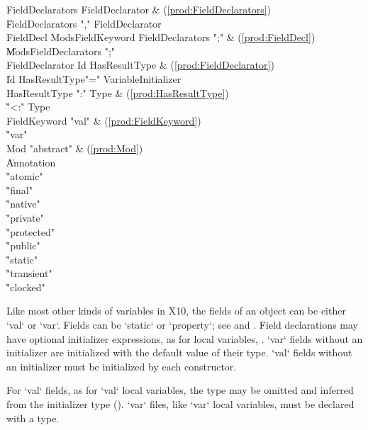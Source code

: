 \begin{bbgrammar}
 FieldDeclarators    \: FieldDeclarator & (\ref{prod:FieldDeclarators})\\%
    \| FieldDeclarators \xcd"," FieldDeclarator\\
 FieldDecl    \: Mods\opt FieldKeyword FieldDeclarators \xcd";" & (\ref{prod:FieldDecl})\\%
    \| Mods\opt FieldDeclarators \xcd";"\\
 FieldDeclarator    \: Id HasResultType & (\ref{prod:FieldDeclarator})\\%
    \| Id HasResultType\opt \xcd"=" VariableInitializer\\
 HasResultType    \: \xcd":" Type & (\ref{prod:HasResultType})\\%
    \| \xcd"<:" Type\\
 FieldKeyword    \: \xcd"val" & (\ref{prod:FieldKeyword})\\%
    \| \xcd"var"\\
 Mod    \: \xcd"abstract" & (\ref{prod:Mod})\\%
    \| Annotation\\
    \| \xcd"atomic"\\
    \| \xcd"final"\\
    \| \xcd"native"\\
    \| \xcd"private"\\
    \| \xcd"protected"\\
    \| \xcd"public"\\
    \| \xcd"static"\\
    \| \xcd"transient"\\
    \| \xcd"clocked"\\

\end{bbgrammar}

Like most other kinds of variables in X10, 
the fields of an object can be either \xcd`val` or \xcd`var`. 
Fields can be \xcd`static` or \xcd`property`; see
 and .
Field declarations may have optional
initializer expressions, as for local variables, .
\xcd`var` fields without an initializer are initialized with the default value
of their type. \xcd`val` fields without an initializer must be initialized by
each constructor.


For \xcd`val` fields, as for \xcd`val` local variables, the type may be
omitted and inferred from the initializer type ().
\xcd`var` files, like \xcd`var` local variables, must be declared with a type.



